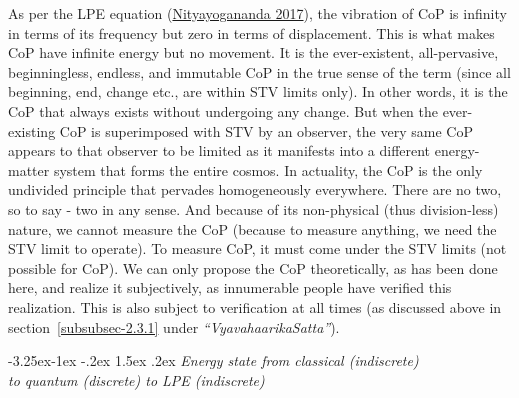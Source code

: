 \documentclass[twoside, 13pt]{article}
\makeatletter
\renewcommand\subsection{\@startsection{subsection}{2}{\z@}%
                                     {-3.25ex\@plus -1ex \@minus -.2ex}%
                                     {1.5ex \@plus .2ex}%
                                     {\normalfont\Large\bfseries}}
\makeatother
\begin{document}
{{As per the LPE equation (\underline{Nityayogananda 2017}), the vibration of CoP is infinity in terms of its frequency but zero in terms of displacement. This is what makes CoP have infinite energy but no movement. It is the ever-existent, all-pervasive, beginningless, endless, and immutable CoP in the true sense of the term (since all beginning, end, change etc., are within STV limits only). In other words, it is the CoP that always exists without undergoing any change. But when the ever-existing CoP is superimposed with STV by an observer, the very same CoP appears to that observer to be limited as it manifests into a different energy-matter system that forms the entire cosmos. In actuality, the CoP is the only undivided principle that pervades homogeneously everywhere. There are no two, so to say - two in any sense. And because of its non-physical (thus division-less) nature, we cannot measure the CoP (because to measure anything, we need the STV limit to operate). To measure CoP, it must come under the STV limits (not possible for CoP). We can only propose the CoP theoretically, as has been done here, and realize it subjectively, as innumerable people have verified this realization. This is also subject to verification at all times (as discussed above in section~\ref{subsubsec-2.3.1} under \textit{“VyavahaarikaSatta”}).}


{\fontsize{8}{10}\selectfont\subsection{\textit{Energy state from classical (indiscrete)\\ to quantum (discrete) to LPE (indiscrete)}}}\label{subsec-3.3}


}
\end{document}
